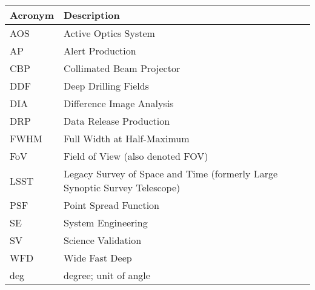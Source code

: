 \addtocounter{table}{-1}
\begin{longtable}{p{}p{}}\hline
\textbf{Acronym} & \textbf{Description}  \\\hline

AOS & Active Optics System \\\hline
AP & Alert Production \\\hline
CBP & Collimated Beam Projector \\\hline
DDF & Deep Drilling Fields \\\hline
DIA & Difference Image Analysis \\\hline
DRP & Data Release Production \\\hline
FWHM & Full Width at Half-Maximum \\\hline
FoV & Field of View (also denoted FOV) \\\hline
LSST & Legacy Survey of Space and Time (formerly Large Synoptic Survey Telescope) \\\hline
PSF & Point Spread Function \\\hline
SE & System Engineering \\\hline
SV & Science Validation \\\hline
WFD & Wide Fast Deep \\\hline
deg & degree; unit of angle \\\hline
\end{longtable}
